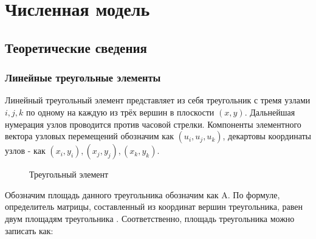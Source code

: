 \documentclass[a4paper, 14pt]{extarticle}
\begin{document}
\newpage

\section{Численная модель}

\subsection{Теоретические сведения}

\subsubsection{Линейные треугольные элементы}

Линейный треугольный элемент представляет из себя треугольник с тремя узлами $i, j, k$ по одному на каждую из трёх вершин в плоскости $(x, y)$. Дальнейшая нумерация узлов проводится против часовой стрелки. Компоненты элементного вектора узловых перемещений обозначим как $\left( u_i, u_j, u_k \right)$, декартовы координаты узлов - как $(x_i, y_i), (x_j, y_j), (x_k, y_k)$. 

\begin{figure}[h]
\caption{Треугольный элемент}
\label{fig:triangle}
\end{figure}

Обозначим площадь данного треугольника обозначим как A. По формуле, определитель матрицы, составленный из координат вершин треугольника, равен двум площадям треугольника \cite{8}. Соответственно, площадь треугольника можно записать как:
\end{document}

